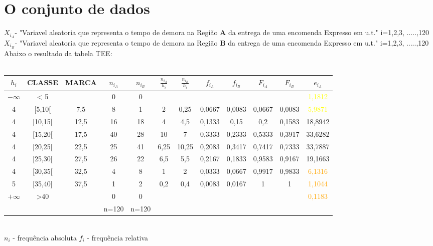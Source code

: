 \section{O conjunto de dados}\label{dados}
\noindent
$X_{i_A}$- "Variavel aleatoria que representa o tempo de demora na Região \textbf{A} da entrega de uma encomenda Expresso em u.t." \quad i=1,2,3, .....,120 \\
$X_{i_B}$- "Variavel aleatoria que representa o tempo de demora na Região \textbf{B} da entrega de uma encomenda Expresso em u.t." \quad i=1,2,3, .....,120 \\
Abaixo o resultado da tabela TEE:\\
\\
\begin{minipage}{0pt}
\begin{tabular}{ |c|c|c|c|c|c|c|c|c|c|c|c| }
\hline
$h_i$ & CLASSE & MARCA & $n_{i_A}$ & $n_{i_B}$ & $\frac{n_{i_A}}{h_i}$ & $\frac{n_{i_B}}{h_i}$ & $f_{i_A}$	& $f_{i_B}$ & $F_{i_A}$ & $F_{i_B}$ & $e_{i_A}$ \\
\hline
$-\infty$ & < 5 & & 0 & 0 & & & & & & & \textcolor{yellow}{1,1812} \\
\hline
4 & [5,10[ & 7,5 & 8 & 1 & 2 & 0,25 & 0,0667 & 0,0083 & 0,0667 & 0,0083 & \textcolor{yellow}{5,9871}\\
\hline
4 & [10,15[ & 12,5 & 16 & 18 & 4 & 4,5 & 0,1333 & 0,15 & 0,2 & 0,1583 & 18,8942\\
\hline
4 & [15,20[ & 17,5 & 40 & 28 & 10 & 7 & 0,3333 & 0,2333 & 0,5333 & 0,3917 & 33,6282\\
\hline
4 & [20,25[ & 22,5 & 25 & 41 & 6,25 & 10,25 & 0,2083 & 0,3417 & 0,7417 & 0,7333 & 33,7887\\
\hline
4 & [25,30[ & 27,5 & 26 & 22 & 6,5 & 5,5 & 0,2167 & 0,1833 & 0,9583 & 0,9167 & 19,1663\\
\hline
4 & [30,35[ & 32,5 & 4 & 8 & 1 & 2 & 0,0333 & 0,0667 & 0,9917 & 0,9833 & \textcolor{orange}{6,1316}\\
\hline
5 & [35,40] & 37,5 & 1 & 2 & 0,2 & 0,4 & 0,0083 & 0,0167 & 1 & 1 & \textcolor{orange}{1,1044}\\
\hline
$+\infty$ & >40 & & 0 & 0 & & & & & & & \textcolor{orange}{0,1183}\\
\hline
& & & n=120 & n=120 & & & & & & & \\
\hline
\end{tabular}
\end{minipage}
\\
$n_i$ - frequência absoluta \quad
$f_i$ - frequência relativa \quad
